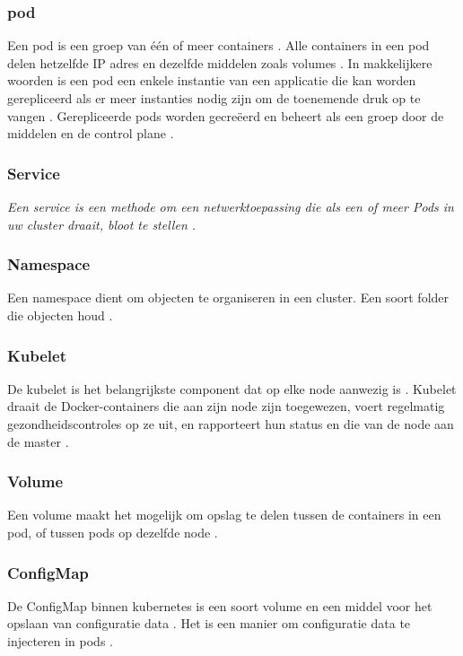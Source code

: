 \subsubsection{pod}
Een pod is een groep van één of meer containers \autocite{habbal-2020}.
Alle containers in een pod delen hetzelfde IP adres en dezelfde middelen zoals volumes \autocite{hohn-2020}.
In makkelijkere woorden is een pod een enkele instantie van een applicatie die kan worden gerepliceerd als er meer instanties nodig zijn om de toenemende druk op te vangen \autocite{habbal-2020}.
Gerepliceerde pods worden gecreëerd en beheert als een groep door de middelen en de control plane \textcite{KubernetesDocs-2023}.

\subsubsection{Service}
\textit{Een service is een methode om een netwerktoepassing die als een of meer Pods in uw cluster draait, bloot te stellen \autocite{KubernetesDocs-2023}.}

\subsubsection{Namespace}
Een namespace dient om objecten te organiseren in een cluster.
Een soort folder die objecten houd \autocite{burns-2022}.

\subsubsection{Kubelet}
De kubelet is het belangrijkste component dat op elke node aanwezig is \autocite{Vayghan2019}.
Kubelet draait de Docker-containers die aan zijn node zijn toegewezen, voert regelmatig gezondheidscontroles op ze uit, en rapporteert hun status en die van de node aan de master \autocite{Vayghan2019}.

\subsubsection{Volume}
Een volume maakt het mogelijk om opslag te delen tussen de containers in een pod, of tussen pods op dezelfde node \autocite{Baier2017}.

\subsubsection{ConfigMap}
De ConfigMap binnen kubernetes is een soort volume en een middel voor het opslaan van configuratie data \autocite{KubernetesDocs-2023}.
Het is een manier om configuratie data te injecteren in pods \autocite{KubernetesDocs-2023}.

